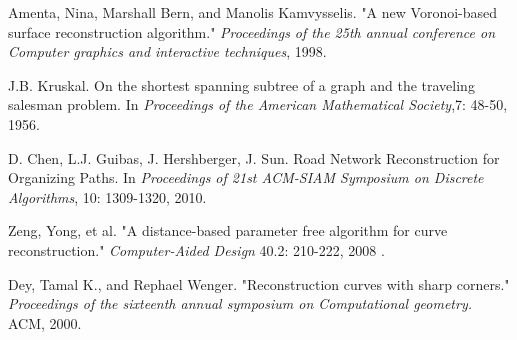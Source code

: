 \documentclass[11pt]{article}
\begin{document}
\begin{thebibliography}{50}


Amenta, Nina, Marshall Bern, and Manolis Kamvysselis. 
"A new Voronoi-based surface reconstruction algorithm." 
\textit{Proceedings of the 25th annual conference on Computer graphics and interactive techniques}, 1998.

J.B. Kruskal.
On the shortest spanning subtree of a graph and the traveling salesman problem.
In \emph{Proceedings of the American Mathematical Society},7: 48-50, 1956.

D. Chen, L.J. Guibas, J. Hershberger, J. Sun.
Road Network Reconstruction for Organizing Paths.
In \emph{Proceedings  of  21st  ACM-SIAM  Symposium  on  Discrete  Algorithms}, 10: 1309-1320, 2010.

Zeng, Yong, et al. "A distance-based parameter free algorithm for curve reconstruction." \textit{Computer-Aided Design} 40.2: 210-222, 2008 .

Dey, Tamal K., and Rephael Wenger. "Reconstruction curves with sharp corners." \textit{Proceedings of the sixteenth annual symposium on Computational geometry.} ACM, 2000.




\end{thebibliography}
\end{document}
